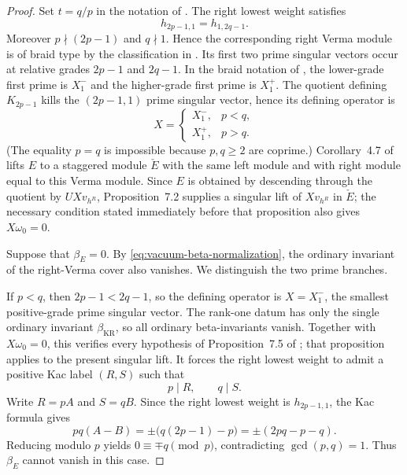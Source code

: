 \documentclass[12pt,leqno]{amsart}
\numberwithin{equation}{section}
\begin{document}
\begin{proof}
Set $t=q/p$ in the notation of \cite{KytolaRidout}.  The right lowest
weight satisfies
\begin{equation}\label{eq:vacuum-braid-weight}
 h_{2p-1,1}=h_{1,2q-1}.
\end{equation}
Moreover $p\nmid(2p-1)$ and $q\nmid1$.  Hence the corresponding right
Verma module is of braid type by the classification in
\cite[Section~2]{KytolaRidout}.  Its first two prime singular vectors occur
at relative grades $2p-1$ and $2q-1$.  In the braid notation of
\cite[Section~7]{KytolaRidout}, the lower-grade first prime is $X^-_1$
and the higher-grade first prime is $X^+_1$.  The quotient defining
$K_{2p-1}$ kills the $(2p-1,1)$ prime singular vector, hence its defining
operator is
\[
 X=\begin{cases}
 X^-_1,&p<q,\\
 X^+_1,&p>q.
 \end{cases}
\]
(The equality $p=q$ is impossible because $p,q\ge2$ are coprime.)
Corollary~4.7 of \cite{KytolaRidout} lifts $E$ to a staggered module
$\check E$ with the same left module and with right module equal to this
Verma module.  Since $E$ is obtained by descending through the quotient by
$UXv_{h^R}$, Proposition~7.2 supplies a singular lift of $Xv_{h^R}$ in
$\check E$; the necessary condition stated immediately before that
proposition also gives $X\omega_0=0$.

Suppose that $\beta_E=0$.  By
\eqref{eq:vacuum-beta-normalization}, the ordinary invariant of the
right-Verma cover also vanishes.  We distinguish the two prime branches.

If $p<q$, then $2p-1<2q-1$, so the defining operator is
$X=X^-_1$, the smallest positive-grade prime singular vector.  The
rank-one datum has only the single ordinary invariant
$\beta_{\mathrm{KR}}$, so all ordinary beta-invariants vanish.  Together
with $X\omega_0=0$, this verifies every hypothesis of Proposition~7.5 of
\cite{KytolaRidout}; that proposition applies to the present singular
lift.  It forces the right lowest weight to admit a positive Kac label
$(R,S)$ such that
\[
 p\mid R,\qquad q\mid S.
\]
Write $R=pA$ and $S=qB$.  Since the right lowest weight is
$h_{2p-1,1}$, the Kac formula gives
\[
 pq(A-B)=\pm\bigl(q(2p-1)-p\bigr)
        =\pm(2pq-p-q).
\]
Reducing modulo $p$ yields $0\equiv\mp q\pmod p$, contradicting
$\gcd(p,q)=1$.  Thus $\beta_E$ cannot vanish in this case.


\end{proof}
\end{document}

